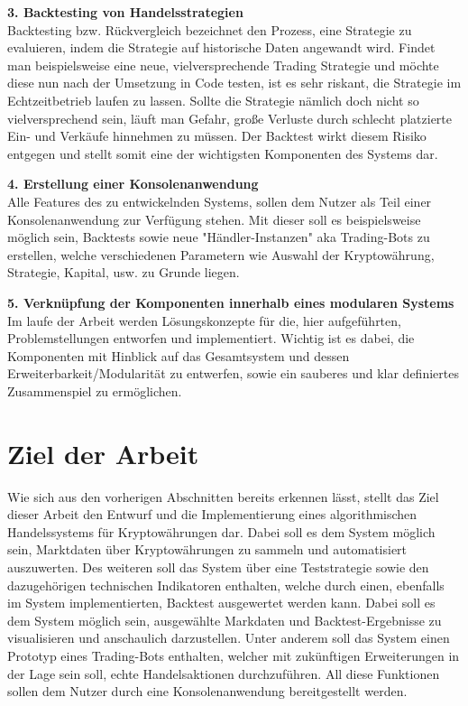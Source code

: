 \documentclass[oneside]{ausarbeitung}
\begin{document}
\textbf{3. Backtesting von Handelsstrategien} \\
Backtesting bzw. Rückvergleich bezeichnet den Prozess, eine Strategie zu evaluieren, indem die Strategie auf historische Daten angewandt wird. Findet man beispielsweise eine neue, vielversprechende Trading Strategie und möchte diese nun nach der Umsetzung in Code testen, ist es sehr riskant, die Strategie im Echtzeitbetrieb laufen zu lassen. Sollte die Strategie nämlich doch nicht so vielversprechend sein, läuft man Gefahr, große Verluste durch schlecht platzierte Ein- und Verkäufe hinnehmen zu müssen. Der Backtest wirkt diesem Risiko entgegen und stellt somit eine der wichtigsten Komponenten des Systems dar. 

\textbf{4. Erstellung einer Konsolenanwendung} \\
Alle Features des zu entwickelnden Systems, sollen dem Nutzer als Teil einer Konsolenanwendung zur Verfügung stehen. Mit dieser soll es beispielsweise möglich sein, Backtests sowie neue "Händler-Instanzen" aka Trading-Bots zu erstellen, welche verschiedenen Parametern wie Auswahl der Kryptowährung, Strategie, Kapital, usw. zu Grunde liegen.

\textbf{5. Verknüpfung der Komponenten innerhalb eines modularen Systems} \\
Im laufe der Arbeit werden Lösungskonzepte für die, hier aufgeführten, Problemstellungen entworfen und implementiert. Wichtig ist es dabei, die Komponenten mit Hinblick auf das Gesamtsystem und dessen Erweiterbarkeit/Modularität zu entwerfen, sowie ein sauberes und klar definiertes Zusammenspiel zu ermöglichen. 

\section{Ziel der Arbeit}
\label{sec:ziel}

Wie sich aus den vorherigen Abschnitten bereits erkennen lässt, stellt das Ziel dieser Arbeit den Entwurf und die Implementierung eines algorithmischen Handelssystems für Kryptowährungen dar. Dabei soll es dem System möglich sein, Marktdaten über Kryptowährungen zu sammeln und automatisiert auszuwerten. Des weiteren soll das System über eine Teststrategie sowie den dazugehörigen technischen Indikatoren enthalten, welche durch einen, ebenfalls im System implementierten, Backtest ausgewertet werden kann. Dabei soll es dem System möglich sein, ausgewählte Markdaten und Backtest-Ergebnisse zu visualisieren und anschaulich darzustellen. Unter anderem soll das System einen Prototyp eines Trading-Bots enthalten, welcher mit zukünftigen Erweiterungen in der Lage sein soll, echte Handelsaktionen durchzuführen. All diese Funktionen sollen dem Nutzer durch eine Konsolenanwendung bereitgestellt werden.
\end{document}
